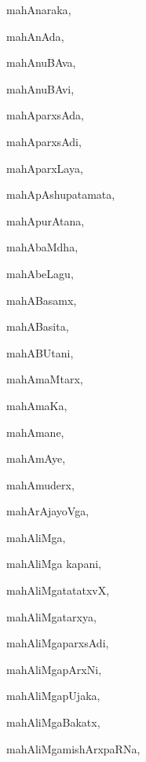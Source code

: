 \begin{multicols}{3}
{\noindent
{mahAnaraka}, \pageref{mahAnaraka}

\noindent
{mahAnAda}, \pageref{mahAnAda}

\noindent
{mahAnuBAva}, \pageref{mahAnuBAva}

\noindent
{mahAnuBAvi}, \pageref{mahAnuBAvi}

\noindent
{mahAparxsAda}, \pageref{mahAparxsAda}

\noindent
{mahAparxsAdi}, \pageref{mahAparxsAdi}

\noindent
{mahAparxLaya}, \pageref{mahAparxLaya}

\noindent
{mahApAshupatamata}, \pageref{mahApAshupatamata}

\noindent
{mahApurAtana}, \pageref{mahApurAtana}

\noindent
{mahAbaMdha}, \pageref{mahAbaMdha}

\noindent
{mahAbeLagu}, \pageref{mahAbeLagu}

\noindent
{mahABasamx}, \pageref{mahABasamx}

\noindent
{mahABasita}, \pageref{mahABasita}

\noindent
{mahABUtani}, \pageref{mahABUtani}

\noindent
{mahAmaMtarx}, \pageref{mahAmaMtarx}

\noindent
{mahAmaKa}, \pageref{mahAmaKa}

\noindent
{mahAmane}, \pageref{mahAmane}

\noindent
{mahAmAye}, \pageref{mahAmAye}

\noindent
{mahAmuderx}, \pageref{mahAmuderx}

\noindent
{mahArAjayoVga}, \pageref{mahArAjayoVga}

\noindent
{mahAliMga}, \pageref{mahAliMga}

\noindent
{mahAliMga kapani}, \pageref{mahAliMga kapani}

\noindent
{mahAliMgatatatxvX}, \pageref{mahAliMgatatatxvX}

\noindent
{mahAliMgatarxya}, \pageref{mahAliMgatarxya}

\noindent
{mahAliMgaparxsAdi}, \pageref{mahAliMgaparxsAdi}

\noindent
{mahAliMgapArxNi}, \pageref{mahAliMgapArxNi}

\noindent
{mahAliMgapUjaka}, \pageref{mahAliMgapUjaka}

\noindent
{mahAliMgaBakatx}, \pageref{mahAliMgaBakatx}

\noindent
{mahAliMgamishArxpaRNa}, \pageref{mahAliMgamishArxpaRNa}

}
\end{multicols}

